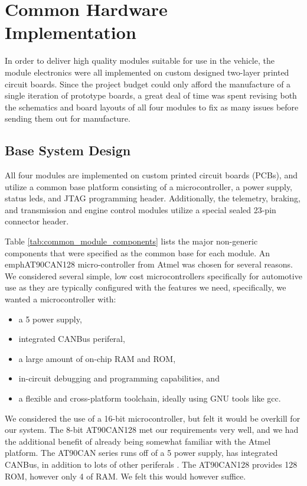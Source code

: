 \section{Common Hardware Implementation\label{sec:hardware_implementation}}

In order to deliver high quality modules suitable for use in the vehicle, the module electronics were all implemented on custom designed two-layer printed circuit boards. Since the project budget could only afford the manufacture of a single iteration of prototype boards, a great deal of time was spent revising both the schematics and board layouts of all four modules to fix as many issues before sending them out for manufacture.


\subsection{Base System Design}

All four modules are implemented on custom printed circuit boards (PCBs), and utilize a common base platform consisting of a microcontroller, a power supply, status leds, and JTAG programming header. Additionally, the telemetry, braking, and transmission and engine control modules utilize a special sealed 23-pin connector header.

Table \ref{tab:common_module_components} lists the major non-generic components that were specified as the common base for each module. An emph{AT90CAN128} micro-controller from Atmel was chosen for several reasons. We considered several simple, low cost microcontrollers specifically for automotive use as they are typically configured with the features we need, specifically, we wanted a microcontroller with:

\begin{itemize}
  \item a \unit{5}{\volt} power supply,
  \item integrated CANBus periferal,
  \item a large amount of on-chip RAM and ROM,
  \item in-circuit debugging and programming capabilities, and
  \item a flexible and cross-platform toolchain, ideally using GNU tools like gcc.
\end{itemize}

We considered the use of a 16-bit microcontroller, but felt it would be overkill for our system. The 8-bit AT90CAN128 met our requirements very well, and we had the additional benefit of already being somewhat familiar with the Atmel platform. The AT90CAN series runs off of a \unit{5}{\volt} power supply, has integrated CANBus, in addition to lots of other periferals \cite{AT90CAN}. The AT90CAN128 provides \unit{128}{\kilo\byte} ROM, however only \unit{4}{\kilo\byte} of RAM. We felt this would however suffice.

